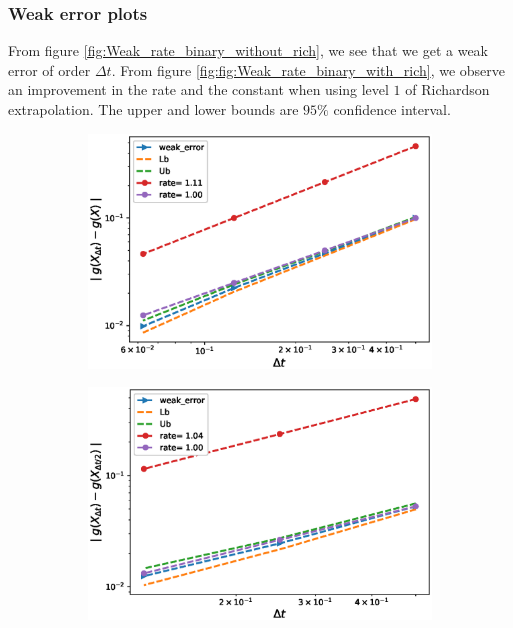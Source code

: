 \documentclass[11pt]{article}
\begin{document}
\newpage
\subsubsection{Weak error plots} \label{sec:Weak error plots_binary}

From figure \ref{fig:Weak_rate_binary_without_rich}, we see that we get a weak error of order $\Delta t$. From figure \ref{fig:fig:Weak_rate_binary_with_rich}, we observe an improvement in the rate and the constant when using level $1$ of Richardson extrapolation. The upper and lower bounds are $95\%$ confidence interval.


\begin{figure}[h!]
	\centering
	\begin{subfigure}{.4\textwidth}
		\centering
		\includegraphics[width=1\linewidth]{./figures/binary_weak_error/without_richardson/weak_convergence_order_binary_option_relative}
		\caption{}
		\label{fig:sub3}
	\end{subfigure}%
	\begin{subfigure}{.4\textwidth}
		\centering
		\includegraphics[width=1\linewidth]{./figures/binary_weak_error/without_richardson/weak_convergence_order_differences_binary_option_relative}
		\caption{}
		\label{fig:sub4}
	\end{subfigure}
	

\end{figure}
\end{document}

